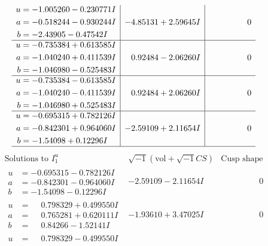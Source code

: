 \documentclass[1p]{elsarticle_modified}
\theoremstyle{definition}
\newcommand{\I}{\sqrt{-1}}
\begin{document}
$$\begin{array}{c|c|c}
\begin{aligned}
u &= -1.005260 - 0.230771 I \\
a &= -0.518244 - 0.930244 I \\
b &= -2.43905 - 0.47542 I\end{aligned}
 & -4.85131 + 2.59645 I & \phantom{-0.000000 } 0 \\ \hline\begin{aligned}
u &= -0.735384 + 0.613585 I \\
a &= -1.040240 + 0.411539 I \\
b &= -1.046980 - 0.525483 I\end{aligned}
 & \phantom{-}0.92484 - 2.06260 I & \phantom{-0.000000 } 0 \\ \hline\begin{aligned}
u &= -0.735384 - 0.613585 I \\
a &= -1.040240 - 0.411539 I \\
b &= -1.046980 + 0.525483 I\end{aligned}
 & \phantom{-}0.92484 + 2.06260 I & \phantom{-0.000000 } 0 \\ \hline\begin{aligned}
u &= -0.695315 + 0.782126 I \\
a &= -0.842301 + 0.964060 I \\
b &= -1.54098 + 0.12296 I\end{aligned}
 & -2.59109 + 2.11654 I & \phantom{-0.000000 } 0\\
 \hline 
 \end{array}$$\newpage$$\begin{array}{c|c|c}  
\text{Solutions to }I^u_{1}& \I (\text{vol} + \sqrt{-1}CS) & \text{Cusp shape}\\
 \hline 
\begin{aligned}
u &= -0.695315 - 0.782126 I \\
a &= -0.842301 - 0.964060 I \\
b &= -1.54098 - 0.12296 I\end{aligned}
 & -2.59109 - 2.11654 I & \phantom{-0.000000 } 0 \\ \hline\begin{aligned}
u &= \phantom{-}0.798329 + 0.499550 I \\
a &= \phantom{-}0.765281 + 0.620111 I \\
b &= \phantom{-}0.84266 - 1.52141 I\end{aligned}
 & -1.93610 + 3.47025 I & \phantom{-0.000000 } 0 \\ \hline\begin{aligned}
u &= \phantom{-}0.798329 - 0.499550 I \\

\end{aligned}
\end{array}$$
\end{document}
